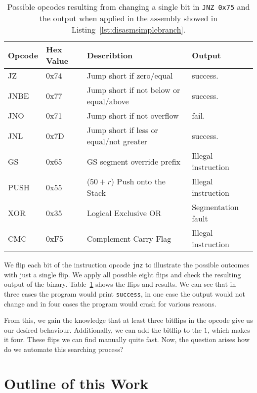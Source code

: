 \begin{table}[]
\centering
\begin{tabular}{|l|l|l|l|}
\hline
Opcode & Hex Value & Describtion                                           &
Output              \\ \hline
JZ     & 0x74      & Jump short if zero/equal                              &
success.            \\ \hline
JNBE   & 0x77      & Jump short if not below or equal/above                &
success.            \\ \hline
JNO    & 0x71      & Jump short if not overflow                            &
fail.               \\ \hline
JNL    & 0x7D      & Jump short if less or equal/not greater               &
success.            \\ \hline
GS     & 0x65      & GS segment override prefix                            &
Illegal instruction \\ \hline
PUSH   & 0x55      & ($50+r$) Push onto the Stack &
Illegal instruction \\ \hline
XOR    & 0x35      & Logical Exclusive OR                                  &
Segmentation fault  \\ \hline
CMC    & 0xF5      & Complement Carry Flag                                 &
Illegal instruction \\ \hline
\end{tabular}
\caption{Possible opcodes resulting from changing a single bit in
\texttt{JNZ}~\texttt{0x75} and the output when applied in the assembly showed in
Listing~\ref{lst:disasmsimplebranch}.}
\label{tab:jnzflips}
\end{table}

We flip each bit of the instruction opcode \texttt{jnz} to illustrate the
possible outcomes with just a single flip. We apply all possible eight flips and
check the resulting output of the binary. Table~\ref{tab:jnzflips} shows the
flips and results. We can see that in three cases the program would print
\texttt{success}, in one case the output would not change and in four cases the
program would crash for various reasons.

From this, we gain the knowledge that at least three bitflips in the opcode give
us our desired behaviour. Additionally, we can add the bitflip to the $1$, which
makes it four. These flips we can find manually quite fast. Now, the question
arises how do we automate this searching process?

\section{Outline of this Work}

